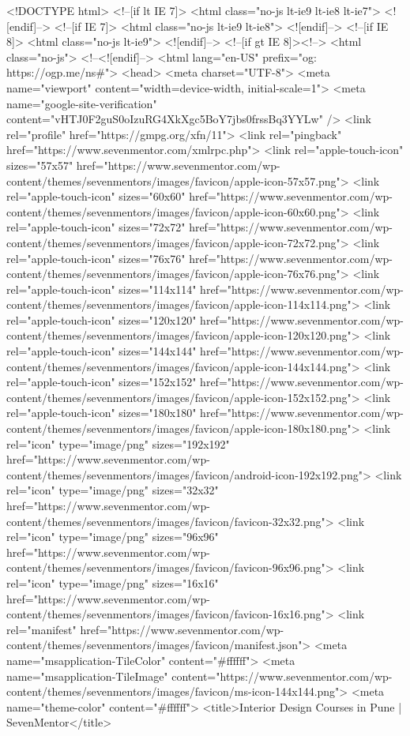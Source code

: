  <!DOCTYPE html>
<!--[if lt IE 7]>
<html class="no-js lt-ie9 lt-ie8 lt-ie7">
<![endif]-->
<!--[if IE 7]>
<html class="no-js lt-ie9 lt-ie8">
<![endif]-->
<!--[if IE 8]>
<html class="no-js lt-ie9">
<![endif]-->
<!--[if gt IE 8]><!-->
<html class="no-js">
<!--<![endif]-->
<html lang="en-US" prefix="og: https://ogp.me/ns#">
<head>
<meta charset="UTF-8">
<meta name="viewport" content="width=device-width, initial-scale=1">
<meta name="google-site-verification" content="vHTJ0F2guS0oIzuRG4XkXgc5BoY7jbs0frssBq3YYLw" />
<link rel="profile" href="https://gmpg.org/xfn/11">
<link rel="pingback" href="https://www.sevenmentor.com/xmlrpc.php">
<link rel="apple-touch-icon" sizes="57x57" href="https://www.sevenmentor.com/wp-content/themes/sevenmentors/images/favicon/apple-icon-57x57.png">
<link rel="apple-touch-icon" sizes="60x60" href="https://www.sevenmentor.com/wp-content/themes/sevenmentors/images/favicon/apple-icon-60x60.png">
<link rel="apple-touch-icon" sizes="72x72" href="https://www.sevenmentor.com/wp-content/themes/sevenmentors/images/favicon/apple-icon-72x72.png">
<link rel="apple-touch-icon" sizes="76x76" href="https://www.sevenmentor.com/wp-content/themes/sevenmentors/images/favicon/apple-icon-76x76.png">
<link rel="apple-touch-icon" sizes="114x114" href="https://www.sevenmentor.com/wp-content/themes/sevenmentors/images/favicon/apple-icon-114x114.png">
<link rel="apple-touch-icon" sizes="120x120" href="https://www.sevenmentor.com/wp-content/themes/sevenmentors/images/favicon/apple-icon-120x120.png">
<link rel="apple-touch-icon" sizes="144x144" href="https://www.sevenmentor.com/wp-content/themes/sevenmentors/images/favicon/apple-icon-144x144.png">
<link rel="apple-touch-icon" sizes="152x152" href="https://www.sevenmentor.com/wp-content/themes/sevenmentors/images/favicon/apple-icon-152x152.png">
<link rel="apple-touch-icon" sizes="180x180" href="https://www.sevenmentor.com/wp-content/themes/sevenmentors/images/favicon/apple-icon-180x180.png">
<link rel="icon" type="image/png" sizes="192x192" href="https://www.sevenmentor.com/wp-content/themes/sevenmentors/images/favicon/android-icon-192x192.png">
<link rel="icon" type="image/png" sizes="32x32" href="https://www.sevenmentor.com/wp-content/themes/sevenmentors/images/favicon/favicon-32x32.png">
<link rel="icon" type="image/png" sizes="96x96" href="https://www.sevenmentor.com/wp-content/themes/sevenmentors/images/favicon/favicon-96x96.png">
<link rel="icon" type="image/png" sizes="16x16" href="https://www.sevenmentor.com/wp-content/themes/sevenmentors/images/favicon/favicon-16x16.png">
<link rel="manifest" href="https://www.sevenmentor.com/wp-content/themes/sevenmentors/images/favicon/manifest.json">
<meta name="msapplication-TileColor" content="#ffffff">
<meta name="msapplication-TileImage" content="https://www.sevenmentor.com/wp-content/themes/sevenmentors/images/favicon/ms-icon-144x144.png">
<meta name="theme-color" content="#ffffff">
<title>Interior Design Courses in Pune | SevenMentor</title>

